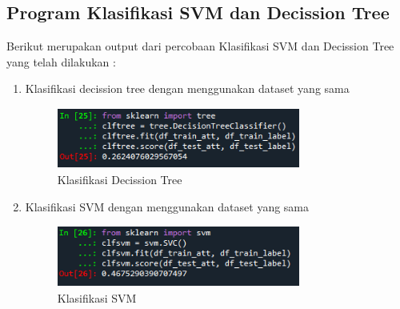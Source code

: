 \subsection{Program Klasifikasi SVM dan Decission Tree}
Berikut merupakan output dari percobaan Klasifikasi SVM dan Decission Tree yang telah dilakukan :
\begin{enumerate}
    \item Klasifikasi decission tree dengan menggunakan dataset yang sama
    \begin{figure}[!htbp]
        \centering
        \includegraphics[width=8cm,height=2cm]{figures/klasifikasi_tree.png}
        \caption{Klasifikasi Decission Tree}
        \label{penanda}
    \end{figure}

    \item Klasifikasi SVM dengan menggunakan dataset yang sama
    \begin{figure}[!htbp]
        \centering
        \includegraphics[width=8cm,height=2cm]{figures/klasifikasi_svm.PNG}
        \caption{Klasifikasi SVM}
        \label{penanda}
    \end{figure}
\end{enumerate}

